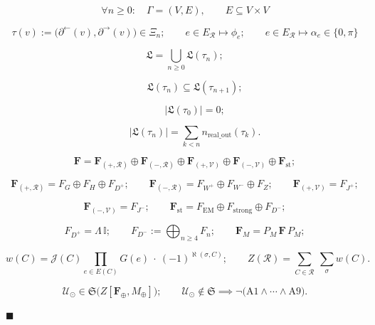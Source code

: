 \begin{axiom}[{\texorpdfstring{A7}{A7}}]\label{tag:A7}
\[
\forall n\ge0:\quad\Gamma=(V,E),\qquad E\subseteq V\times V
\]

\[
\tau(v):=\bigl(\partial^{\leftarrow}(v),\partial^{\rightarrow}(v)\bigr)\in\Xi_n;\qquad
e\in E_{\mathcal R}\mapsto\phi_e;\qquad
e\in E_{\mathcal R}\mapsto\alpha_e\in\{0,\pi\}
\]

\[
\mathfrak L=\bigcup_{n\ge0}\mathfrak L(\tau_n);
\]

\[
\qquad \mathfrak L(\tau_n)\subseteq\mathfrak L(\tau_{n+1});
\]

\[
\qquad \bigl|\mathfrak L(\tau_0)\bigr|=0;
\]

\[
\qquad \bigl|\mathfrak L(\tau_n)\bigr|=\sum_{k<n}n_{\mathrm{real\_out}}(\tau_k) .
\]

\end{axiom}

\begin{axiom}[{\texorpdfstring{A8}{A8}}]\label{tag:A8}
\[
\mathbf F=\mathbf F_{(+,\mathcal R)}\oplus\mathbf F_{(-,\mathcal R)}\oplus\mathbf F_{(+,\mathcal V)}\oplus\mathbf F_{(-,\mathcal V)}\oplus\mathbf F_{\mathrm{st}};
\]

\[
\mathbf F_{(+,\mathcal R)}=F_G\oplus F_H\oplus F_{D^+};\qquad
\mathbf F_{(-,\mathcal R)}=F_{W^+}\oplus F_{W^-}\oplus F_Z;\qquad
\mathbf F_{(+,\mathcal V)}=F_{J^+};
\]

\[
\mathbf F_{(-,\mathcal V)}=F_{J^-};\qquad
\mathbf F_{\mathrm{st}}=F_{\mathrm{EM}}\oplus F_{\mathrm{strong}}\oplus F_{D^-};
\]

\[
F_{D^+}=\Lambda\,\mathbb I;\qquad
F_{D^-}:=\bigoplus_{n\ge4}F_n;\qquad
\mathbf F_M=P_M\,\mathbf F\,P_M;
\]

\[
w(C)=\mathcal J(C)\!\!\prod_{e\in E(C)}\!\!G(e)\ \cdot\ (-1)^{\aleph(\sigma,C)};\qquad
Z(\mathcal R)=\sum_{C\in\mathcal R}\ \sum_\sigma w(C) .
\]

\end{axiom}

\begin{axiom}[{\texorpdfstring{A9}{A9}}]\label{tag:A9}
\[
\mathcal U_\odot\in\mathfrak S\bigl(Z[\mathbf F_\oplus,M_\oplus]\bigr);\qquad
\mathcal U_\odot\notin\mathfrak S\implies\neg\bigl(\mathrm{A1}\wedge\cdots\wedge\mathrm{A9}\bigr) .
\]

$\blacksquare$

\end{axiom}

